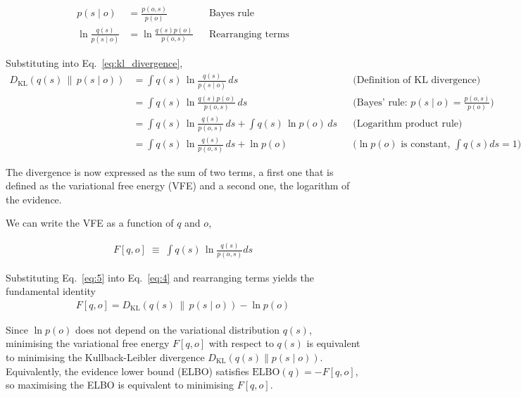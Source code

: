 \documentclass[a4paper, twoside]{article}
\begin{document}
\begin{align}
        p(s\mid o) &= \frac{p(o,s)}{p(o)} && \text{Bayes rule} \\  
        \ln\frac{q(s)}{p(s\mid o)} &= \ln\frac{q(s)p(o)}{p(o,s)} && \text{Rearranging terms}
\end{align}
       
Substituting into Eq.~\ref{eq:kl_divergence},
\begin{align}
D_{\mathrm{KL}}\!\left(q(s)\,\|\,p(s\mid o)\right)
&= \int q(s)\,\ln\frac{q(s)}{p(s\mid o)}\,ds
&& \text{(Definition of KL divergence)}
\tag{1}
\\
&= \int q(s)\,\ln\frac{q(s)p(o)}{p(o,s)}\,ds
&& \text{(Bayes' rule: $p(s\mid o)=\frac{p(o,s)}{p(o)}$)}
\tag{2}
\\
&= \int q(s)\,\ln\frac{q(s)}{p(o,s)}\,ds
+ \int q(s)\,\ln p(o)\,ds
&& \text{(Logarithm product rule)}
\tag{3}
\\
&= \int q(s)\,\ln\frac{q(s)}{p(o,s)}\,ds
+ \ln p(o)
&& \text{($\ln p(o)$ is constant, $\int q(s)ds=1$)}
\label{eq:4}
\end{align}

\noindent
The divergence is now expressed as the sum of two terms, a first one that is defined as the 
variational free energy (VFE) and a second one, the logarithm of the evidence.

We can write the VFE as a function of $q$ and $o$,

\begin{align}
F[q,o]
\;\equiv\;
\int q(s)\,\ln\frac{q(s)}{p(o,s)}ds 
\label{eq:5}
\end{align}

\noindent
Substituting Eq.~\ref{eq:5} into Eq.~\ref{eq:4} and rearranging terms yields the fundamental identity
\begin{align}
\boxed{
F[q,o]
= D_{\mathrm{KL}}\!\left(q(s)\,\|\,p(s\mid o)\right)
- \ln p(o)
}
\label{eq:vfe_identity}
\end{align}

\noindent
Since $\ln p(o)$ does not depend on the variational distribution $q(s)$, minimising the variational free energy $F[q,o]$ with respect to $q(s)$ is equivalent to minimising the Kullback-Leibler divergence $D_{\mathrm{KL}}(q(s)\|p(s\mid o))$. 
Equivalently, the evidence lower bound (ELBO) \cite{bishop2006prml} satisfies $\mathrm{ELBO}(q)= -F[q,o]$, so maximising the ELBO is equivalent to minimising $F[q,o]$.
\end{document}
